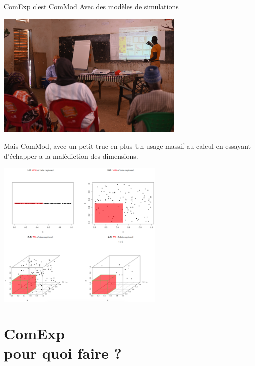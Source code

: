 \documentclass[newPxFont]{beamer}
\begin{document}
\begin{frame}[c]{ComExp c'est ComMod}
  \vspace{-1cm}
  Avec des modèles de simulations
  \begin{center}
  \includegraphics[width=9cm]{img/modelSimu.JPG}
  \end{center}
\end{frame}

\begin{frame}[c]{Mais ComMod, avec un petit truc en plus}
  \vspace{-1cm}
  \small Un usage massif au calcul en essayant d'échapper a la malédiction des dimensions.
\begin{center}
 \includegraphics[width=8cm]{img/CurseOfDimensionality.png}
\end{center}
\end{frame}


\section{ComExp\\ pour quoi faire ?}
\end{document}
